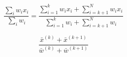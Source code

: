 \documentclass[a4paper]{article}
\begin{document}
\begin{equation}
  \frac{\sum_i w_i x_i }{\sum_i w_i} = \frac{\sum_{i=1}^{k} w_i x_i + \sum_{i=k+1}^{N} w_i x_i}{\sum_{i=1}^{k} w_i + \sum_{i=k+1}^{N} w_i}
\end{equation}

\begin{equation}
  \frac{\bar{x}^{(k)} + \bar{x}^{(k+1)}}{\bar{w}^{(k)} + \bar{w}^{(k+1)}}
\end{equation}
\end{document}
